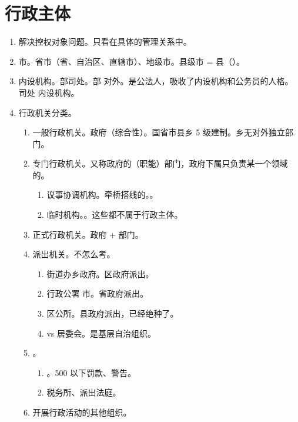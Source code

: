 \section{行政主体}
\begin{enumerate}
  \item 解决控权对象问题。只看在具体的管理关系中。
  \item 市。省市（省、自治区、直辖市）、地级市。县级市 = 县（）。
  \item 内设机构。部司处。部 \yjt 对外。是公法人，吸收了内设机构和公务员的人格。司处 \yjt 内设机构。
  \item 行政机关分类。
        \begin{enumerate}
          \item 一般行政机关。政府（综合性）。国省市县乡 5 级建制。乡无对外独立部门。
          \item 专门行政机关。又称政府的（职能）部门，政府下属只负责某一个领域的。
                \begin{enumerate}
                  \item 议事协调机构。牵桥搭线的。。
                  \item 临时机构。。\sjt 这些都不属于行政主体。
                \end{enumerate}
          \item 正式行政机关。政府 + 部门。
          \item 派出机关。不怎么考。
                \begin{enumerate}
                  \item 街道办\ydy 乡政府。区政府派出。
                  \item 行政公署 \ydy 市。省政府派出。
                  \item 区公所。县政府派出，已经绝种了。
                  \item vs 居委会。是基层自治组织。
                \end{enumerate}
          \item {}。
                \begin{enumerate}
                  \item {}。500 以下罚款、警告。
                  \item 税务所、派出法庭。
                \end{enumerate}
          \item 开展行政活动的其他组织。
                \begin{enumerate}

\end{enumerate}
\end{enumerate}
\end{enumerate}
